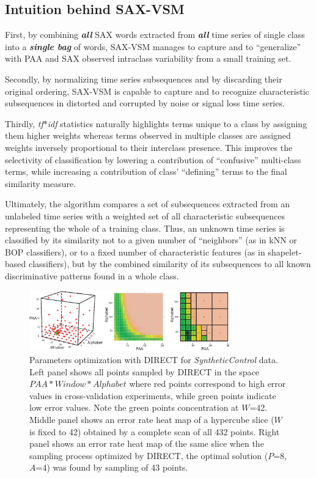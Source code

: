 \documentclass[conference]{IEEEtran}
\begin{document}
\subsection{Intuition behind SAX-VSM}
First, by combining \textit{\textbf{all}} SAX words extracted from 
\textit{\textbf{all}} time series of single class into a \textit{\textbf{single bag}} of 
words, SAX-VSM manages to capture and to ``generalize'' with PAA and SAX 
observed intraclass variability from a small training set.  

Secondly, by normalizing time series subsequences and by discarding their original 
ordering, SAX-VSM is capable to capture and to recognize characteristic 
subsequences in distorted and corrupted by noise or signal loss time series. 

Thirdly, \textit{tf$\ast$idf} statistics naturally highlights terms unique to a
class by assigning them higher weights whereas terms observed in multiple classes are 
assigned weights inversely proportional to their interclass presence. This
improves the selectivity of classification by lowering a contribution of ``confusive'' 
multi-class terms, while increasing a contribution of class' ``defining'' terms to the
final similarity measure.

Ultimately, the algorithm compares a set of subsequences extracted from an unlabeled 
time series with a weighted set of all characteristic subsequences representing the whole 
of a training class. 
Thus, an unknown time series is classified by its similarity not to a given number of 
``neighbors'' (as in kNN or BOP classifiers), or to a fixed number of characteristic features 
(as in shapelet-based classifiers), but by the combined similarity of its subsequences to 
all known discriminative patterns found in a whole class.

\begin{figure}[t]
   \centering
   \vspace{0.05cm}
   \includegraphics[width=87mm]{figures/figure_direct.eps}
   \caption{Parameters optimization with DIRECT for \textit{SyntheticControl} data. 
   Left panel shows all points sampled by DIRECT in the space $PAA*Window*Alphabet$ where
   red points correspond to high error values in cross-validation experiments, 
   while green points indicate low error values. 
   Note the green points concentration at $W$=42. 
   Middle panel shows an error rate heat map of a hypercube slice ($W$ is fixed to 42)
   obtained by a complete scan of all 432 points. 
   Right panel shows an error rate heat map of the same slice when 
   the sampling process optimized by DIRECT, 
   the optimal solution ($P$=8,$A$=4) was found by sampling of 43 points.}
   \vspace{-0.15cm}
   \label{fig:direct-sampling}
\end{figure}
\end{document}
